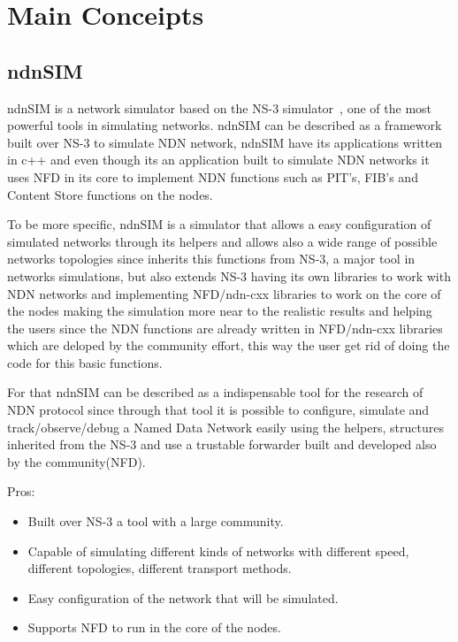 \documentclass[preprint,12pt]{elsarticle}
\begin{document}
\section{Main Conceipts}
\label{S:2}
\subsection{ndnSIM}
ndnSIM is a network simulator based on the NS-3 simulator~\cite{ndnSIM}, one of the most powerful tools in simulating networks. ndnSIM can be described as a framework built over NS-3 to simulate NDN network, ndnSIM have its applications written in c++ and even though its an application built to simulate NDN networks it uses NFD in its core to implement NDN functions such as PIT's, FIB's and Content Store functions on the nodes. \par
To be more specific, ndnSIM is a simulator that allows a easy configuration of simulated networks through its helpers and allows also a wide range of possible networks topologies since inherits this functions from NS-3, a major tool in networks simulations, but also extends NS-3 having its own libraries to work with NDN networks and implementing NFD/ndn-cxx libraries to work on the core of the nodes making the simulation more near to the realistic results and helping the users since the NDN functions are already written in NFD/ndn-cxx libraries which are deloped by the community effort, this way the user get rid of doing the code for this basic functions.\par  
For that ndnSIM can be described as a indispensable tool for the research of NDN protocol since through that tool it is possible to configure, simulate and track/observe/debug a Named Data Network easily using the helpers, structures inherited from the NS-3 and use a trustable forwarder built and developed also by the community(NFD).\par
Pros:
\begin{itemize}
		\item Built over NS-3 a tool with a large community.
		
		\item Capable of simulating different kinds of networks with different speed, different topologies, different transport methods.
		
		\item Easy configuration of the network that will be simulated.
		
		\item Supports NFD to run in the core of the nodes.
	\end{itemize}
\end{document}
